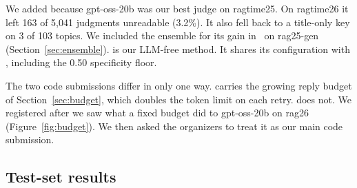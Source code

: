 We added  because gpt-oss-20b was our best judge on
ragtime25. On ragtime26 it left 163 of 5,041 judgments unreadable (3.2\%). It also fell back to a title-only key on 3 of 103 topics. We included the ensemble
 for its gain in \tauap\ on rag25-gen
(Section~\ref{sec:ensemble}).  is our LLM-free method. It
shares its configuration with , including the 0.50 specificity
floor.

The two  code submissions differ in only one way.
 carries the growing reply budget of Section~\ref{sec:budget},
which doubles the token limit on each retry.  does not. We
registered  after we saw what a fixed budget did to gpt-oss-20b on
rag26 (Figure~\ref{fig:budget}). We then asked the organizers to treat it as our
main code submission.

\subsection{Test-set results}

